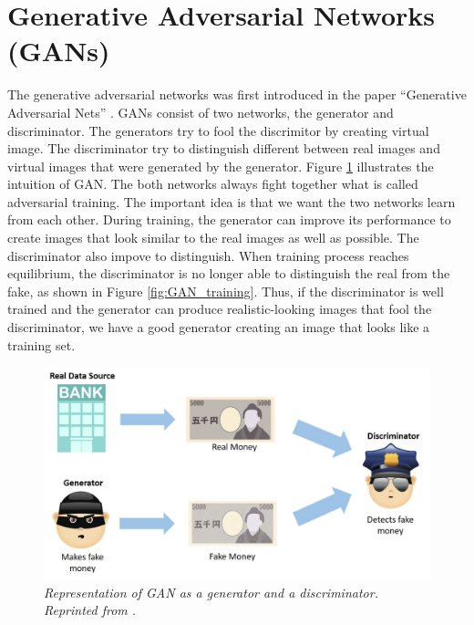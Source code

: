 \section{Generative Adversarial Networks (GANs)}

The generative adversarial networks was first introduced in the paper ``Generative Adversarial Nets'' \cite{goodfellow_pouget_abadie_mirza_xu_warde_farley_ozair_courville_bengio_2014}. GANs consist of two networks, the generator and discriminator. The generators try to fool the discrimitor by creating virtual image. The discriminator try to distinguish different between real images and virtual images that were generated by the generator. Figure \ref{fig:GAN} illustrates the intuition of GAN. The both networks always fight together what is called adversarial training. The important idea is that we want the two networks learn from each other. During training, the generator can improve its performance to create images that look similar to the real images as well as possible. The discriminator also impove to distinguish. When training process reaches equilibrium, the discriminator is no longer able to distinguish the real from the fake, as shown in Figure \ref{fig:GAN_training}. Thus, if the discriminator is well trained and the generator can produce realistic-looking images that fool the discriminator, we have a good generator creating an image that looks like a training set.

\begin{figure}[H]
  \centering
  \caption[Representation of GAN as a generator and a discriminator.]{\emph{Representation of GAN as a generator and a discriminator. \\
      Reprinted from \citeauthor{ai_research_innovationhub_2020} \citeyear{ai_research_innovationhub_2020}.}}\label{fig:GAN}
  \includegraphics[scale = 0.3]{figures/GANs.jpg}
\end{figure}

